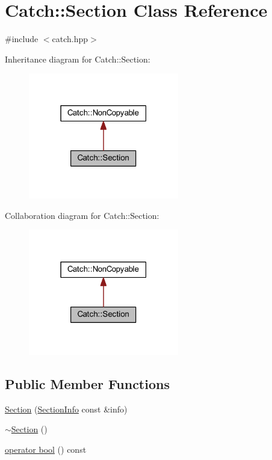 \hypertarget{class_catch_1_1_section}{}\section{Catch\+:\+:Section Class Reference}
\label{class_catch_1_1_section}


{\ttfamily \#include $<$catch.\+hpp$>$}



Inheritance diagram for Catch\+:\+:Section\+:\nopagebreak
\begin{figure}[H]
\begin{center}
\leavevmode
\includegraphics[width=186pt]{class_catch_1_1_section__inherit__graph}
\end{center}
\end{figure}


Collaboration diagram for Catch\+:\+:Section\+:\nopagebreak
\begin{figure}[H]
\begin{center}
\leavevmode
\includegraphics[width=186pt]{class_catch_1_1_section__coll__graph}
\end{center}
\end{figure}
\subsection*{Public Member Functions}
\begin{DoxyCompactItemize}
\item 
\hyperlink{class_catch_1_1_section_a68fd4e51e8981aaa7ddb00d8a6abd099}{Section} (\hyperlink{struct_catch_1_1_section_info}{Section\+Info} const \&info)
\item 
\hyperlink{class_catch_1_1_section_aa1422edd68a77aa578b5cc6b8b69f86f}{$\sim$\+Section} ()
\item 
\hyperlink{class_catch_1_1_section_a0632b804dcea1417a2970620a9742eb3}{operator bool} () const
\end{DoxyCompactItemize}


